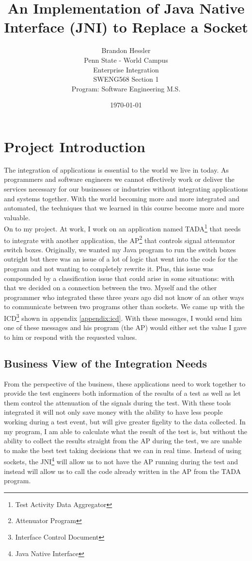\documentclass [a4paper,12pt,oneside,final,titlepage]{article}
\title{An Implementation of Java Native Interface (JNI) to Replace a Socket}
\author{Brandon Hessler  \\
	Penn State - World Campus  \\
	Enterprise Integration \\
	SWENG568 Section 1 \\
	Program: Software Engineering M.S. \\
	}
\date{\today}
\begin{document}
	\maketitle
	\tableofcontents
	\newpage
	\section{Project Introduction}
	The integration of applications is essential to the world we live in today. As programmers and software engineers we cannot effectively work or deliver the services necessary for our businesses or industries without integrating applications and systems together. With the world becoming more and more integrated and automated, the techniques that we learned in this course become more and more valuable.\\

On to my project. At work, I work on an application named TADA\footnote{Test Activity Data Aggregator} that needs to integrate with another application, the AP\footnote{Attenuator Program} that controls signal attenuator switch boxes. Originally, we wanted my Java program to run the switch boxes outright but there was an issue of a lot of logic that went into the code for the program and not wanting to completely rewrite it. Plus, this issue was compounded by a classification issue that could arise in some situations: with that we decided on a connection between the two. Myself and the other programmer who integrated these three years ago did not know of an other ways to communicate between two programs other than sockets. We came up with the ICD\footnote{Interface Control Document} shown in appendix \ref{appendix:icd}. With these messages, I would send him one of these messages and his program (the AP) would either set the value I gave to him or respond with the requested values. \\


	\subsection{Business View of the Integration Needs }
	From the perspective of the business, these applications need to work together to provide the test engineers both information of the results of a test as well as let them control the attenuation of the signals during the test. With these tools integrated it will not only save money with the ability to have less people working during a test event, but will give greater figelity to the data collected. In my program, I am able to calculate what the result of the test is, but without the ability to collect the results straight from the AP during the test, we are unable to make the best test taking decisions that we can in real time. Instead of using sockets, the JNI\footnote{Java Native Interface} will allow us to not have the AP running during the test and instead will allow us to call the code already written in the AP from the TADA program. 
\end{document}
